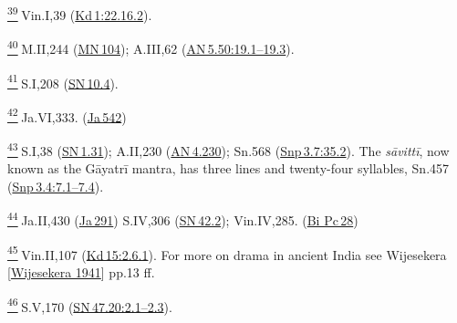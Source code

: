 \label{footprints_split_024.html_fn39}
\hyperref[footprints_split_006.htmlux5cux23fnref39]{\textsuperscript{39}} Vin.I,39
(\href{https://suttacentral.net/pli-tv-kd1/en/brahmali\#22.16.2}{Kd\,1:22.16.2}).

\label{footprints_split_024.html_fn40}
\hyperref[footprints_split_006.htmlux5cux23fnref40]{\textsuperscript{40}} M.II,244
(\href{https://suttacentral.net/mn104/en/sujato}{MN\,104}); A.III,62
(\href{https://suttacentral.net/an5.50/en/sujato\#19.1}{AN\,5.50:19.1--19.3}).

\label{footprints_split_024.html_fn41}
\hyperref[footprints_split_006.htmlux5cux23fnref41]{\textsuperscript{41}} S.I,208
(\href{https://suttacentral.net/sn10.4/en/sujato}{SN\,10.4}).

\label{footprints_split_024.html_fn42}
\hyperref[footprints_split_006.htmlux5cux23fnref42]{\textsuperscript{42}} Ja.VI,333.
(\href{https://suttacentral.net/ja542}{Ja\,542})

\label{footprints_split_024.html_fn43}
\hyperref[footprints_split_006.htmlux5cux23fnref43]{\textsuperscript{43}} S.I,38
(\href{https://suttacentral.net/sn1.31/en/sujato}{SN\,1.31}); A.II,230
(\href{https://suttacentral.net/an4.230/en/sujato}{AN\,4.230}); Sn.568
(\href{https://suttacentral.net/snp3.7/en/sujato\#35.2}{Snp\,3.7:35.2}).
The \emph{sāvittī}, now known as the Gāyatrī mantra, has three lines and
twenty-four syllables, Sn.457
(\href{https://suttacentral.net/snp3.4/en/sujato\#7.1}{Snp\,3.4:7.1--7.4}).

\label{footprints_split_024.html_fn44}
\hyperref[footprints_split_006.htmlux5cux23fnref44]{\textsuperscript{44}} Ja.II,430
(\href{https://suttacentral.net/ja291}{Ja\,291}) S.IV,306
(\href{https://suttacentral.net/sn42.2/en/sujato}{SN\,42.2});
Vin.IV,285.
(\href{https://suttacentral.net/pli-tv-bi-vb-pc28/en/brahmali\#1.2}{Bi
Pc\,28})

\label{footprints_split_024.html_fn45}
\hyperref[footprints_split_006.htmlux5cux23fnref45]{\textsuperscript{45}} Vin.II,107
(\href{https://suttacentral.net/pli-tv-kd15/en/brahmali\#2.6.1}{Kd\,15:2.6.1}).
For more on drama in ancient India see {Wijesekera
{{[}\hyperref[footprints_split_022.htmlux5cux23Wijesekeraux5cux25201941]{Wijesekera
1941}{]}}} pp.13 ff.

\label{footprints_split_024.html_fn46}
\hyperref[footprints_split_006.htmlux5cux23fnref46]{\textsuperscript{46}} S.V,170
(\href{https://suttacentral.net/sn47.20/en/sujato\#2.1}{SN\,47.20:2.1--2.3}).

